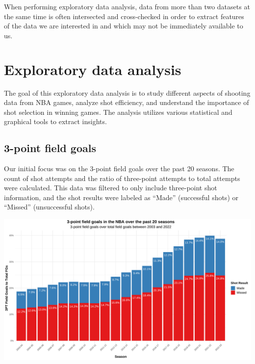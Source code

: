 \documentclass[
  12pt,
  a4paper,
]{article}
\let\origfigure\figure
\let\endorigfigure\endfigure
\renewenvironment{figure}[1][2] {
    \expandafter\origfigure\expandafter[H]
} {
    \endorigfigure
}
\begin{document}
When performing exploratory data analysis, data from more than two datasets at the same time is often intersected and cross-checked in order to extract features of the data we are interested in and which may not be immediately available to us.

\hypertarget{exploratory-data-analysis}{%
\section{Exploratory data analysis}\label{exploratory-data-analysis}}

The goal of this exploratory data analysis is to study different aspects of shooting data from NBA games, analyze shot efficiency, and understand the importance of shot selection in winning games. The analysis utilizes various statistical and graphical tools to extract insights.

\hypertarget{point-field-goals}{%
\subsection{3-point field goals}\label{point-field-goals}}

Our initial focus was on the 3-point field goals over the past 20 seasons. The count of shot attempts and the ratio of three-point attempts to total attempts were calculated. This data was filtered to only include three-point shot information, and the shot results were labeled as ``Made'' (successful shots) or ``Missed'' (unsuccessful shots).

\begin{figure}

{\centering \includegraphics[width=1\linewidth]{latex/plots/plot_1} 

}

\caption{3-point field goals over total field goals between 2003 and 2022}\label{fig:3ptprog}
\end{figure}
\end{document}
